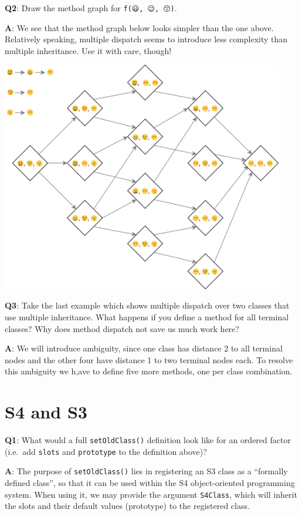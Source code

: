 \documentclass[
]{krantz}
\begin{document}
\textbf{{Q2}}: Draw the method graph for \texttt{f(😃,\ 😉,\ 😙)}.

\textbf{{A}}: We see that the method graph below looks simpler than the one above. Relatively speaking, multiple dispatch seems to introduce less complexity than multiple inheritance. Use it with care, though!

\begin{center}\includegraphics[width=350pt]{diagrams/s4/method_dispatch2} \end{center}

\textbf{{Q3}}: Take the last example which shows multiple dispatch over two classes that use multiple inheritance. What happens if you define a method for all terminal classes? Why does method dispatch not save us much work here?

\textbf{{A}}: We will introduce ambiguity, since one class has distance 2 to all terminal nodes and the other four have distance 1 to two terminal nodes each. To resolve this ambiguity we h,ave to define five more methods, one per class combination.

\hypertarget{s4-and-s3}{%
\section{S4 and S3}\label{s4-and-s3}}

\textbf{{Q1}}: What would a full \texttt{setOldClass()} definition look like for an ordered factor (i.e.~add \texttt{slots} and \texttt{prototype} to the definition above)?

\textbf{{A}}: The purpose of \texttt{setOldClass()} lies in registering an S3 class as a ``formally defined class'', so that it can be used within the S4 object-oriented programming system. When using it, we may provide the argument \texttt{S4Class}, which will inherit the slots and their default values (prototype) to the registered class.
\end{document}

